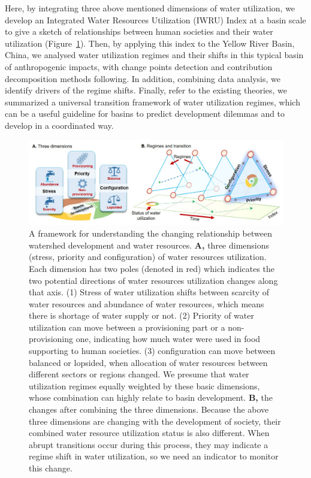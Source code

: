 \documentclass[9pt, twocolumn, twoside, lineno]{pnas-new}
\begin{document}
Here, by integrating three above mentioned dimensions of water utilization, we develop an Integrated Water Resources Utilization (IWRU) Index at a basin scale to give a sketch of relationships between human societies and their water utilization (Figure~\ref{fig:framework}).
Then, by applying this index to the Yellow River Basin, China, we analysed water utilization regimes and their shifts in this typical basin of anthropogenic impacts, with change points detection and contribution decomposition methods following.
In addition, combining data analysis, we identify drivers of the regime shifts. 
Finally, refer to the existing theories, we summarized a universal transition framework of water utilization regimes, which can be a useful guideline for basins to predict development dilemmas and to develop in a coordinated way.


\begin{figure}%
	\centering
	\includegraphics[width=0.8\linewidth]{../../figures/main/framework.jpg}
	\caption{
		A framework for understanding the changing relationship between watershed development and water resources.
		\textbf{A,} three dimensions (stress, priority and configuration) of water resources utilization. Each dimension has two poles (denoted in red) which indicates the two potential directions of water resources utilization changes along that axis. (1) Stress of water utilization shifts between scarcity of water resources and abundance of water resources, which means there is shortage of water supply or not. (2) Priority of water utilization can move between a provisioning part or a non-provisioning one, indicating how much water were used in food supporting to human societies. (3) configuration can move between balanced or lopsided, when allocation of water resources between different sectors or regions changed. We presume that water utilization regimes equally weighted by these basic dimensions, whose combination can highly relate to basin development. 
		\textbf{B,} the changes after combining the three dimensions. Because the above three dimensions are changing with the development of society, their combined water resource utilization status is also different. When abrupt transitions occur during this process, they may indicate a regime shift in water utilization, so we need an indicator to monitor this change.
	}
	\label{fig:framework}
\end{figure}
\end{document}
